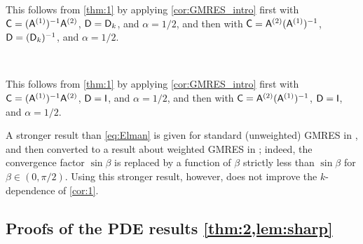 \label{page:cor1proof}
This follows from \cref{thm:1} by applying \cref{cor:GMRES_intro} first with $\mathsf{C}= (\mathsf{A}^{(1)})^{-1} \mathsf{A}^{(2)}$, $\mathsf{D}=\mathsf{D}_k$, and $\alpha=1/2$, and then with $\mathsf{C}= \mathsf{A}^{(2)}(\mathsf{A}^{(1)})^{-1} $, $\mathsf{D}=(\mathsf{D}_k)^{-1}$, and $\alpha=1/2$.
\epf

\

\label{page:cor1aproof}
This follows from \cref{thm:1} by applying \cref{cor:GMRES_intro} first with $\mathsf{C}= (\mathsf{A}^{(1)})^{-1} \mathsf{A}^{(2)}$, $\mathsf{D}=\mathsf{I}$, and $\alpha=1/2$, and then with $\mathsf{C}= \mathsf{A}^{(2)}(\mathsf{A}^{(1)})^{-1} $, $\mathsf{D}=\mathsf{I}$, and $\alpha=1/2$.
\epf


A stronger result than \cref{eq:Elman} is given for standard (unweighted) GMRES in \cite[Theorem 2.1]{BeGoTy:06}, and then converted to a result about weighted GMRES in \cite[Theorem 5.3]{BoDoGrSpTo:19}; indeed, the convergence factor $\sin \beta$ is replaced by a function of $\beta$ strictly less than $\sin\beta$ for $\beta\in (0,\pi/2)$. Using this stronger result, however, does not improve the $k$-dependence of \cref{cor:1}.
\ere



\subsection{Proofs of the PDE results \cref{thm:2,lem:sharp}}\label{sec:pdeproofs}

